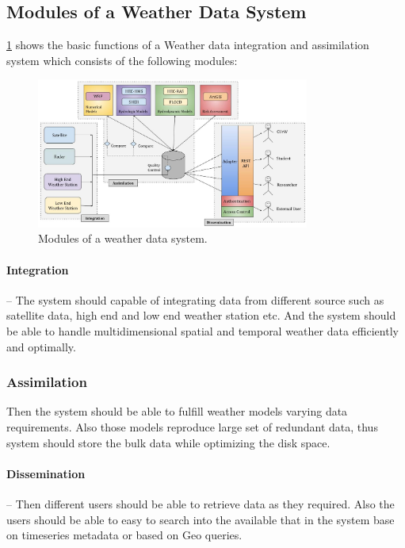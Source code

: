 \subsection{Modules of a Weather Data System}
\label{subse:modules_weather_data_integration_sys}

\cref{fi:wdia_components} shows the basic functions of a Weather data integration and assimilation system which consists of the following modules:
\begin{figure}[htbp]
\centerline{\includegraphics[width=0.8\textwidth]{method/misc/weather_data_system_components.jpg}}
\caption{Modules of a weather data system.}
\label{fi:wdia_components}
\end{figure}

\paragraph{Integration}-- The system should capable of integrating data from different source such as satellite data, high end and low end weather station etc. And the system should be able to handle multidimensional spatial and temporal weather data efficiently and optimally. 
\subsubsection{Assimilation}
Then the system should be able to fulfill weather models varying data requirements. Also those models reproduce large set of redundant data, thus system should store the bulk data while optimizing the disk space.
\paragraph{Dissemination}-- Then different users should be able to retrieve data as they required. Also the users should be able to easy to search into the available that in the system base on timeseries metadata or based on Geo queries.



